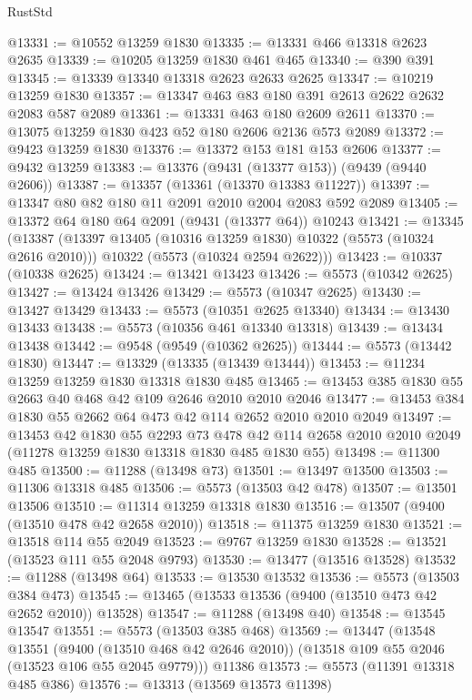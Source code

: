\begin{lexlean}{RustStd}
\begin{coremodule}
@13331 := @10552 @13259 @1830
@13335 := @13331 @466 @13318 @2623 @2635
@13339 := @10205 @13259 @1830 @461 @465
@13340 := @390 @391
@13345 := @13339 @13340 @13318 @2623 @2633 @2625
@13347 := @10219 @13259 @1830
@13357 := @13347 @463 @83 @180 @391 @2613 @2622 @2632 @2083 @587 @2089
@13361 := @13331 @463 @180 @2609 @2611
@13370 := @13075 @13259 @1830 @423 @52 @180 @2606 @2136 @573 @2089
@13372 := @9423 @13259 @1830
@13376 := @13372 @153 @181 @153 @2606
@13377 := @9432 @13259
@13383 := @13376 (@9431 (@13377 @153)) (@9439 (@9440 @2606))
@13387 := @13357 (@13361 (@13370 @13383 @11227))
@13397 := @13347 @80 @82 @180 @11 @2091 @2010 @2004 @2083 @592 @2089
@13405 := @13372 @64 @180 @64 @2091 (@9431 (@13377 @64)) @10243
@13421 := @13345
    (@13387
      (@13397 @13405 (@10316 @13259 @1830) @10322 (@5573 (@10324 @2616 @2010)))
      @10322
      (@5573 (@10324 @2594 @2622)))
@13423 := @10337 (@10338 @2625)
@13424 := @13421 @13423
@13426 := @5573 (@10342 @2625)
@13427 := @13424 @13426
@13429 := @5573 (@10347 @2625)
@13430 := @13427 @13429
@13433 := @5573 (@10351 @2625 @13340)
@13434 := @13430 @13433
@13438 := @5573 (@10356 @461 @13340 @13318)
@13439 := @13434 @13438
@13442 := @9548 (@9549 (@10362 @2625))
@13444 := @5573 (@13442 @1830)
@13447 := @13329 (@13335 (@13439 @13444))
@13453 := @11234 @13259 @13259 @1830 @13318 @1830 @485
@13465 := @13453 @385 @1830 @55 @2663 @40 @468 @42 @109 @2646 @2010 @2010 @2046
@13477 := @13453 @384 @1830 @55 @2662 @64 @473 @42 @114 @2652 @2010 @2010 @2049
@13497 := @13453
    @42
    @1830
    @55
    @2293
    @73
    @478
    @42
    @114
    @2658
    @2010
    @2010
    @2049
    (@11278 @13259 @1830 @13318 @1830 @485 @1830 @55)
@13498 := @11300 @485
@13500 := @11288 (@13498 @73)
@13501 := @13497 @13500
@13503 := @11306 @13318 @485
@13506 := @5573 (@13503 @42 @478)
@13507 := @13501 @13506
@13510 := @11314 @13259 @13318 @1830
@13516 := @13507 (@9400 (@13510 @478 @42 @2658 @2010))
@13518 := @11375 @13259 @1830
@13521 := @13518 @114 @55 @2049
@13523 := @9767 @13259 @1830
@13528 := @13521 (@13523 @111 @55 @2048 @9793)
@13530 := @13477 (@13516 @13528)
@13532 := @11288 (@13498 @64)
@13533 := @13530 @13532
@13536 := @5573 (@13503 @384 @473)
@13545 := @13465 (@13533 @13536 (@9400 (@13510 @473 @42 @2652 @2010)) @13528)
@13547 := @11288 (@13498 @40)
@13548 := @13545 @13547
@13551 := @5573 (@13503 @385 @468)
@13569 := @13447
    (@13548
      @13551
      (@9400 (@13510 @468 @42 @2646 @2010))
      (@13518 @109 @55 @2046 (@13523 @106 @55 @2045 @9779)))
    @11386
@13573 := @5573 (@11391 @13318 @485 @386)
@13576 := @13313 (@13569 @13573 @11398)

\end{coremodule}
\end{lexlean}
